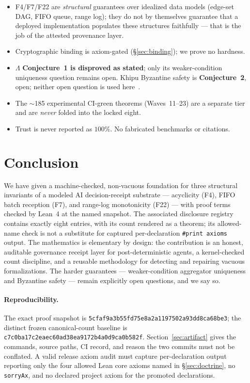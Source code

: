 \documentclass[11pt,letterpaper]{article}
\theoremstyle{definition}
\begin{document}
\begin{itemize}
\item F4/F7/F22 are \emph{structural} guarantees over idealized data models
  (edge-set DAG, FIFO queue, range log); they do not by themselves guarantee that
  a deployed implementation populates these structures faithfully --- that is the
  job of the attested provenance layer.
\item Cryptographic binding is axiom-gated (\S\ref{sec:binding}); we prove no
  hardness.
\item $\Lambda$ \textbf{Conjecture~1 is disproved as stated}; only its
  weaker-condition uniqueness question remains open. Khipu Byzantine safety is
  \textbf{Conjecture~2}, open; neither open question is used
  here~\cite{ouroboros25}.
\item The $\sim$185 experimental CI-green theorems (Waves~11--23) are a separate
  tier and are \emph{never} folded into the locked eight.
\item Trust is never reported as $100\%$. No fabricated benchmarks or citations.
\end{itemize}

\section{Conclusion}\label{sec:conclusion}

We have given a machine-checked, non-vacuous foundation for three structural
invariants of a modeled AI decision-receipt substrate --- acyclicity (F4), FIFO
batch reception (F7), and range-log monotonicity (F22) --- with proof terms
checked by Lean~4 at the named snapshot. The associated disclosure registry
contains exactly eight entries, with its count rendered as a theorem; its
allowed-name check is not a substitute for captured per-declaration
\texttt{\#print axioms} output. The mathematics is elementary by design: the
contribution is an honest, auditable governance receipt layer for
post-deterministic agents, a kernel-checked count discipline, and a reusable
methodology for detecting and repairing vacuous formalizations. The harder
guarantees --- weaker-condition aggregator uniqueness and Byzantine safety ---
remain explicitly open questions, and we say so.

\paragraph{Reproducibility.} The exact proof snapshot is
\texttt{5cfaf9a3b55fd75e8a2a1197502a93dd8ca68be3}; the distinct frozen
canonical-count baseline is \texttt{c7c0ba17c2eaec60ad38ea9172b4a0d9ca0b582f}.
Section~\ref{sec:artifact} gives the commands, source paths, CI record, and
reason the two commits must not be conflated. A valid release axiom audit must
capture per-declaration output reporting only the four allowed Lean core axioms
named in \S\ref{sec:doctrine}, no \texttt{sorryAx}, and no declared project
axiom for the promoted declarations.
\end{document}
